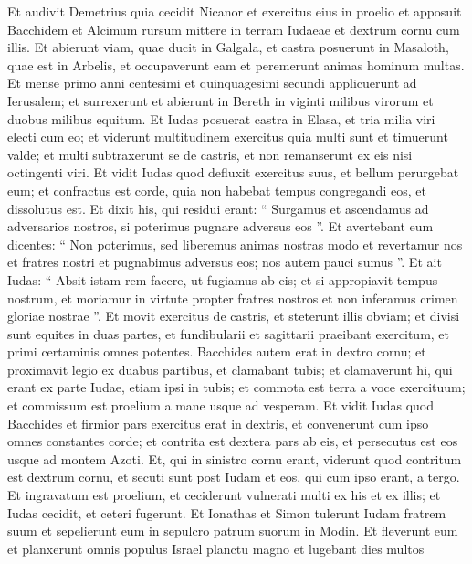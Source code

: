 \begin{biblechapter}
\begin{biblechapter}
\begin{biblechapter}
\begin{biblechapter}
\begin{biblechapter}
\begin{biblechapter}
\begin{biblechapter}
\begin{biblechapter}
\begin{biblechapter}
\verse Et audivit Demetrius quia cecidit Nicanor et exercitus eius in proelio et apposuit Bacchidem et Alcimum rursum mittere in terram Iudaeae et dextrum cornu cum illis. 
\verse Et abierunt viam, quae ducit in Galgala, et castra posuerunt in Masaloth, quae est in Arbelis, et occupaverunt eam et peremerunt animas hominum multas. 
\verse Et mense primo anni centesimi et quinquagesimi secundi applicuerunt ad Ierusalem; 
\verse et surrexerunt et abierunt in Bereth in viginti milibus virorum et duobus milibus equitum. 
\verse Et Iudas posuerat castra in Elasa, et tria milia viri electi cum eo; 
\verse et viderunt multitudinem exercitus quia multi sunt et timuerunt valde; et multi subtraxerunt se de castris, et non remanserunt ex eis nisi octingenti viri. 
\verse Et vidit Iudas quod defluxit exercitus suus, et bellum perurgebat eum; et confractus est corde, quia non habebat tempus congregandi eos, 
\verse et dissolutus est. Et dixit his, qui residui erant: “ Surgamus et ascendamus ad adversarios nostros, si poterimus pugnare adversus eos ”. 
\verse Et avertebant eum dicentes: “ Non poterimus, sed liberemus animas nostras modo et revertamur nos et fratres nostri et pugnabimus adversus eos; nos autem pauci sumus ”. 
\verse Et ait Iudas: “ Absit istam rem facere, ut fugiamus ab eis; et si appropiavit tempus nostrum, et moriamur in virtute propter fratres nostros et non inferamus crimen gloriae nostrae ”. 
\verse Et movit exercitus de castris, et steterunt illis obviam; et divisi sunt equites in duas partes, et fundibularii et sagittarii praeibant exercitum, et primi certaminis omnes potentes. 
\verse Bacchides autem erat in dextro cornu; et proximavit legio ex duabus partibus, et clamabant tubis; et clamaverunt hi, qui erant ex parte Iudae, etiam ipsi in tubis; 
\verse et commota est terra a voce exercituum; et commissum est proelium a mane usque ad vesperam.
 \verse Et vidit Iudas quod Bacchides et firmior pars exercitus erat in dextris, et convenerunt cum ipso omnes constantes corde; 
\verse et contrita est dextera pars ab eis, et persecutus est eos usque ad montem Azoti. 
\verse Et, qui in sinistro cornu erant, viderunt quod contritum est dextrum cornu, et secuti sunt post Iudam et eos, qui cum ipso erant, a tergo. 
\verse Et ingravatum est proelium, et ceciderunt vulnerati multi ex his et ex illis; 
\verse et Iudas cecidit, et ceteri fugerunt. 
\verse Et Ionathas et Simon tulerunt Iudam fratrem suum et sepelierunt eum in sepulcro patrum suorum in Modin. 
\verse Et fleverunt eum et planxerunt omnis populus Israel planctu magno et lugebant dies multos 

\end{biblechapter}
\end{biblechapter}
\end{biblechapter}
\end{biblechapter}
\end{biblechapter}
\end{biblechapter}
\end{biblechapter}
\end{biblechapter}
\end{biblechapter}
